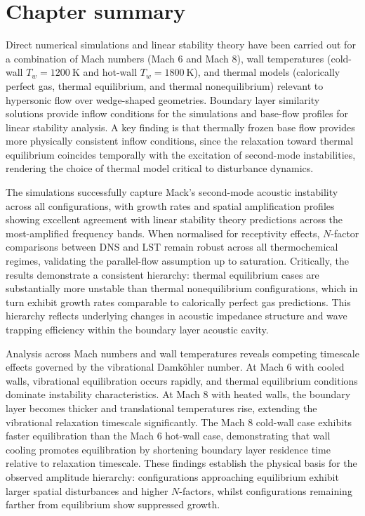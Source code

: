 \section{Chapter summary}

Direct numerical simulations and linear stability theory have been carried out for a combination of Mach numbers (Mach 6 and Mach 8), wall temperatures (cold-wall $T_w = 1200~\mathrm{K}$ and hot-wall $T_w = 1800~\mathrm{K}$), and thermal models (calorically perfect gas, thermal equilibrium, and thermal nonequilibrium) relevant to hypersonic flow over wedge-shaped geometries. Boundary layer similarity solutions provide inflow conditions for the simulations and base-flow profiles for linear stability analysis. A key finding is that thermally frozen base flow provides more physically consistent inflow conditions, since the relaxation toward thermal equilibrium coincides temporally with the excitation of second-mode instabilities, rendering the choice of thermal model critical to disturbance dynamics.


The simulations successfully capture Mack's second-mode acoustic instability across all configurations, with growth rates and spatial amplification profiles showing excellent agreement with linear stability theory predictions across the most-amplified frequency bands. When normalised for receptivity effects, $N$-factor comparisons between \gls{DNS} and \gls{LST} remain robust across all thermochemical regimes, validating the parallel-flow assumption up to saturation. Critically, the results demonstrate a consistent hierarchy: thermal equilibrium cases are substantially more unstable than thermal nonequilibrium configurations, which in turn exhibit growth rates comparable to calorically perfect gas predictions. This hierarchy reflects underlying changes in acoustic impedance structure and wave trapping efficiency within the boundary layer acoustic cavity.

Analysis across Mach numbers and wall temperatures reveals competing timescale effects governed by the vibrational Damköhler number. At Mach 6 with cooled walls, vibrational equilibration occurs rapidly, and thermal equilibrium conditions dominate instability characteristics. At Mach 8 with heated walls, the boundary layer becomes thicker and translational temperatures rise, extending the vibrational relaxation timescale significantly. The Mach 8 cold-wall case exhibits faster equilibration than the Mach 6 hot-wall case, demonstrating that wall cooling promotes equilibration by shortening boundary layer residence time relative to relaxation timescale. These findings establish the physical basis for the observed amplitude hierarchy: configurations approaching equilibrium exhibit larger spatial disturbances and higher $N$-factors, whilst configurations remaining farther from equilibrium show suppressed growth.

